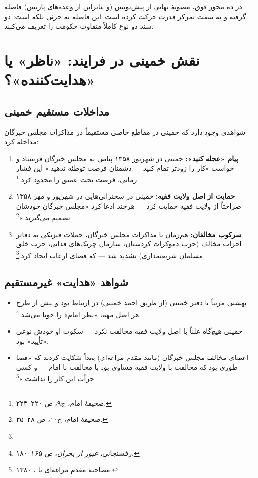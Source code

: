 \begin{warningBox}
در  ده محور فوق، مصوبهٔ نهایی از پیش‌نویس (و بنابراین از وعده‌های پاریس) فاصله گرفته و به سمت تمرکز قدرت حرکت کرده است. این فاصله نه جزئی بلکه  است: دو سند دو نوع کاملاً متفاوت حکومت را تعریف می‌کنند.
\end{warningBox}

\section{نقش خمینی در فرایند: «ناظر» یا «هدایت‌کننده»؟}

\subsection{مداخلات مستقیم خمینی}

شواهدی وجود دارد که خمینی در مقاطع خاصی مستقیماً در مذاکرات مجلس خبرگان مداخله کرد:

\begin{enumerate}[label=\textcolor{cPrimary}{\bfseries\arabic*.}, rightmargin=2em]
    \item \textbf{پیام «عجله کنید»:} خمینی در شهریور ۱۳۵۸ پیامی به مجلس خبرگان فرستاد و خواست «کار را زودتر تمام کنید — دشمنان فرصت توطئه ندهید.» این فشار زمانی، فرصت بحث عمیق را محدود کرد.\footnote{صحیفهٔ امام، ج۹، ص ۲۲۰–۲۲۳.}
    
    \item \textbf{حمایت از اصل ولایت فقیه:} خمینی در سخنرانی‌هایی در شهریور و مهر ۱۳۵۸ صراحتاً از ولایت فقیه حمایت کرد — هرچند ادعا کرد «مجلس خبرگان خودشان تصمیم می‌گیرند.»\footnote{صحیفهٔ امام، ج۱۰، ص ۲۸–۳۵.}
    
    \item \textbf{سرکوب مخالفان:} هم‌زمان با مذاکرات مجلس خبرگان، حملات فیزیکی به دفاتر احزاب مخالف (حزب دموکرات کردستان، سازمان چریک‌های فدایی، حزب خلق مسلمان شریعتمداری) تشدید شد — که فضای ارعاب ایجاد کرد.\footnote{}
\end{enumerate}

\subsection{شواهد «هدایت» غیرمستقیم}

\begin{itemize}[label=\textcolor{cConsolid}{$\blacktriangleright$}, rightmargin=2em]
    \item بهشتی مرتباً با دفتر خمینی (از طریق احمد خمینی) در ارتباط بود و پیش از طرح هر اصل مهم، «نظر امام» را جویا می‌شد.\footnote{رفسنجانی، \textit{عبور از بحران}، ص ۱۶۵–۱۸۰.}
    \item خمینی هیچ‌گاه علناً با اصل ولایت فقیه مخالفت نکرد — سکوت او خودش نوعی «تأیید» بود.
    \item اعضای مخالف مجلس خبرگان (مانند مقدم مراغه‌ای) بعداً شکایت کردند که «فضا طوری بود که مخالفت با ولایت فقیه مساوی بود با مخالفت با امام — و کسی جرأت این کار را نداشت.»\footnote{مصاحبهٔ مقدم مراغه‌ای با ، ۱۳۸۰.}
\end{itemize}

